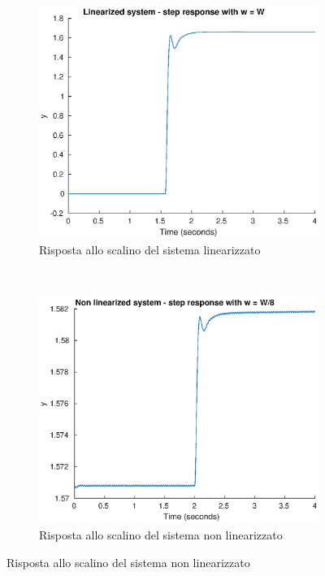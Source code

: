 \documentclass[a4paper]{article}
\begin{document}
\begin{figure}[h]
    \centering
\begin{subfigure}[t]{0.3\textwidth}
    \centering
    \includegraphics[width=\textwidth]{step_lin}
    \caption{Risposta allo scalino del sistema linearizzato}
    \label{fig:step_sim_lin}
\end{subfigure}
~
\begin{subfigure}[t]{0.3\textwidth}
    \centering
    \includegraphics[width=\textwidth]{step_nonlin_short}
    \caption{Risposta allo scalino del sistema non linearizzato}
    \label{fig:step_sim_nonlin}

\end{subfigure}
\end{figure}
\end{document}
